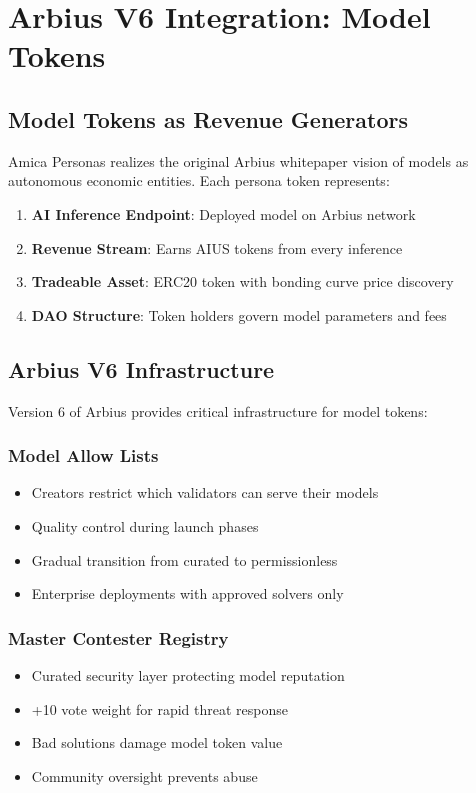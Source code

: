 \documentclass{article}
\begin{document}
\section{Arbius V6 Integration: Model Tokens}

\subsection{Model Tokens as Revenue Generators}

Amica Personas realizes the original Arbius whitepaper vision of models as autonomous economic entities. Each persona token represents:

\begin{enumerate}
    \item \textbf{AI Inference Endpoint}: Deployed model on Arbius network
    \item \textbf{Revenue Stream}: Earns AIUS tokens from every inference
    \item \textbf{Tradeable Asset}: ERC20 token with bonding curve price discovery
    \item \textbf{DAO Structure}: Token holders govern model parameters and fees
\end{enumerate}

\subsection{Arbius V6 Infrastructure}

Version 6 of Arbius provides critical infrastructure for model tokens:

\subsubsection{Model Allow Lists}
\begin{itemize}
    \item Creators restrict which validators can serve their models
    \item Quality control during launch phases
    \item Gradual transition from curated to permissionless
    \item Enterprise deployments with approved solvers only
\end{itemize}

\subsubsection{Master Contester Registry}
\begin{itemize}
    \item Curated security layer protecting model reputation
    \item +10 vote weight for rapid threat response
    \item Bad solutions damage model token value
    \item Community oversight prevents abuse
\end{itemize}
\end{document}
